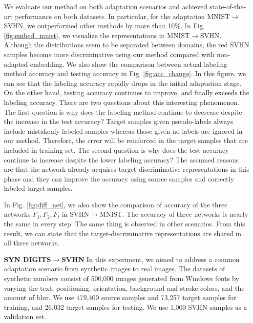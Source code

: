 \documentclass{article}
\begin{document}
We evaluate our method on both adaptation scenarios and achieved state-of-the-art performance on both datasets. In particular, for the adaptation MNIST$\rightarrow$SVHN, we outperformed other methods by more than 10\%. In Fig. \ref{fig:embed_mnist}, we visualize the representations in MNIST$\rightarrow$SVHN. Although the distributions seem to be separated between domains, the red SVHN samples become more discriminative using our method compared with non-adapted embedding. We also show the comparison between actual labeling method accuracy and testing accuracy in Fig. \ref{fig:acc_change}. In this figure, we can see that the labeling accuracy rapidly drops in the initial adaptation stage. On the other hand, testing accuracy continues to improve, and finally exceeds the labeling accuracy.
There are two questions about this interesting phenomenon. The first question is why does the labeling method continue to decrease despite the increase in the test accuracy? Target samples given pseudo-labels always include mistakenly labeled samples whereas those given no labels are ignored in our method. Therefore, the error will be reinforced in the target samples that are included in training set. The second question is why does the test accuracy continue to increase despite the lower labeling accuracy? The assumed reasons are that the network already acquires target discriminative representations in this phase and they can improve the accuracy using source samples and correctly labeled target samples.

In Fig. \ref{fig:diff_net}, we also show the comparison of accuracy of the three networks $F_1,F_2,F_t$ in SVHN$\rightarrow$MNIST. The accuracy of three networks is nearly the same in every step. The same thing is observed in other scenarios. From this result, we can state that the target-discriminative representations are shared in all three networks. 

\textbf{SYN DIGITS$\rightarrow$SVHN}
In this experiment, we aimed to address a common adaptation scenario from synthetic images to real images. The datasets of synthetic numbers \cite{ganin2014unsupervised} consist of 500,000 images generated from Windows fonts by varying the text, positioning, orientation, background and stroke colors, and the amount of blur. We use 479,400 source samples and 73,257 target samples for training, and 26,032 target samples for testing. We use 1,000 SVHN samples as a validation set.
\end{document}
